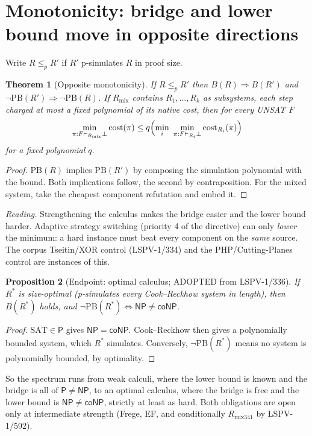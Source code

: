 \documentclass[11pt]{article}
\newtheorem{theorem}{Theorem}
\newtheorem{proposition}[theorem]{Proposition}
\theoremstyle{definition}
\newcommand{\Pclass}{\mathsf{P}}
\newcommand{\NP}{\mathsf{NP}}
\newcommand{\coNP}{\mathsf{coNP}}
\newcommand{\SAT}{\mathrm{SAT}}
\newcommand{\PB}{\mathrm{PB}}
\begin{document}
\section{Monotonicity: bridge and lower bound move in opposite directions}
Write $R\le_p R'$ if $R'$ p-simulates $R$ in proof size.
\begin{theorem}[Opposite monotonicity]\label{thm:mono}
If $R\le_p R'$ then $B(R)\Rightarrow B(R')$ and $\neg\PB(R')\Rightarrow\neg\PB(R)$.
If $R_{\mathrm{mix}}$ contains $R_1,\dots,R_k$ as subsystems, each step charged at
most a fixed polynomial of its native cost, then for every UNSAT $F$
\[
\min_{\pi:F\vdash_{R_{\mathrm{mix}}}\bot}\operatorname{cost}(\pi)
\le q\Bigl(\min_i\ \min_{\pi:F\vdash_{R_i}\bot}\operatorname{cost}_{R_i}(\pi)\Bigr)
\]
for a fixed polynomial $q$.
\end{theorem}
\begin{proof}
$\PB(R)$ implies $\PB(R')$ by composing the simulation polynomial with the
bound. Both implications follow, the second by contraposition. For the mixed
system, take the cheapest component refutation and embed it.
\end{proof}

\textit{Reading.} Strengthening the calculus makes the bridge easier and the
lower bound harder. Adaptive strategy switching (priority 4 of the directive)
can only \emph{lower} the minimum: a hard instance must beat every component on
the \emph{same} source. The corpus Tseitin/XOR control (LSPV-1/334) and the
PHP/Cutting-Planes control are instances of this.

\begin{proposition}[Endpoint: optimal calculus; ADOPTED from LSPV-1/336]
If $R^\ast$ is size-optimal (p-simulates every Cook--Reckhow system in length),
then $B(R^\ast)$ holds, and $\neg\PB(R^\ast)\iff\NP\neq\coNP$.
\end{proposition}
\begin{proof}
$\SAT\in\Pclass$ gives $\NP=\coNP$. Cook--Reckhow then gives a polynomially
bounded system, which $R^\ast$ simulates. Conversely, $\neg\PB(R^\ast)$ means no
system is polynomially bounded, by optimality.
\end{proof}

So the spectrum runs from weak calculi, where the lower bound is known and the
bridge is all of $\Pclass\ne\NP$, to an optimal calculus, where the bridge is
free and the lower bound is $\NP\ne\coNP$, strictly at least as hard. Both
obligations are open only at intermediate strength (Frege, EF, and conditionally
$R_{\mathrm{mix341}}$ by LSPV-1/592).
\end{document}
